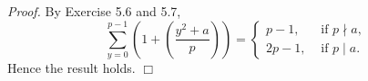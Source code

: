 \documentclass{article}
\begin{document}
\emph{Proof.}
By Exercise 5.6 and 5.7,
\begin{equation*}
  \sum_{y=0}^{p-1} \left( 1 + \left( \frac{y^2 + a}{p} \right) \right) =
    \begin{cases}
      p-1,  & \text{ if $p \nmid a$}, \\
      2p-1, & \text{ if $p \mid a$}.
    \end{cases}
\end{equation*}
Hence the result holds.
$\Box$ \\\\



\end{document}
